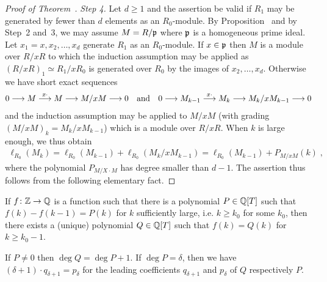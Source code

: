 \documentclass[a4paper,parskip=half,numbers=enddot, DIV=12]{scrreprt}
\begin{document}
\begin{proof}[Proof of Theorem~]
    \emph{Step 4.} Let $d\geq 1$ and the assertion be valid if $R_1$ may be generated by fewer than $d$ elements as an $R_0$-module. By Proposition~ and by Step~2 and~3, we may assume $M=R/\mathfrak{p}$ where $\mathfrak{p}$ is a homogeneous prime ideal. Let $x_1=x,x_2,\ldots, x_d$ generate $R_1$ as an $R_0$-module. If $x\in\mathfrak{p}$ then $M$ is a module over $R/x R$ to which the induction assumption may be applied as $(R/xR)_1\simeq R_1/xR_0$ is generated over $R_0$ by the images of $x_2,\ldots, x_d$. Otherwise we have short exact sequences 
    \begin{align*}
        0 \morphism M \morphism[x\cdot] M \morphism M/xM \morphism 0\quad\text{and}\quad
        0 \morphism M_{k-1}\morphism[x\cdot] M_k \morphism M_k/x M_{k-1} \morphism 0
    \end{align*}
    and the induction assumption may be applied to $M/xM$ (with grading $(M/xM)_k = M_k/xM_{k-1}$) which is a module over $R/xR$. When $k$ is large enough, we thus obtain
    \begin{align*}
    	\ell_{R_0}(M_k)=\ell_{R_0}(M_{k-1})+\ell_{R_0}(M_k/xM_{k-1})=\ell_{R_0}(M_{k-1})+P_{M/xM}(k)\;,
    \end{align*}
    where the polynomial $P_{M/X\cdot M}$ has degree smaller than $d-1$. The assertion thus follows from the following elementary fact.
\end{proof}
\begin{fact}
    \begin{alphanumerate}
    \item {}
        If $f\colon \IZ\morphism \IQ$ is a function such that there is a polynomial $P\in\mathbb{Q}[T]$ such that $f(k) -f(k-1) = P(k)$ for $k$ sufficiently large, i.e. $k\geq k_0$ for some $k_0$, then there exists a (unique) polynomial $Q\in\mathbb{Q}[T]$ such that $f(k) = Q(k)$ for $k\geq k_0-1$. 
    \item 
        If $P\neq 0$ then $\deg Q = \deg P +1$. If $\deg P = \delta$, then we have $(\delta+1) \cdot q_{\delta+1} = p_\delta$ for the leading coefficients $q_{\delta+1}$ and $p_\delta$ of $Q$ respectively $P$. 
    \end{alphanumerate}
\end{fact}
\end{document}

